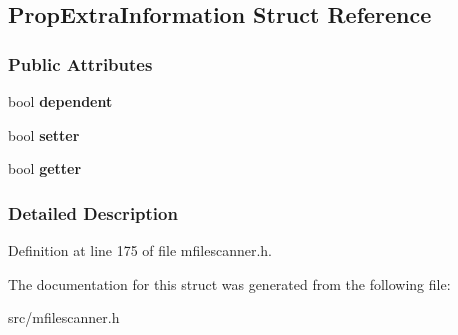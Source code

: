 \hypertarget{struct_prop_extra_information}{}\subsection{Prop\+Extra\+Information Struct Reference}
\label{struct_prop_extra_information}
\subsubsection*{Public Attributes}
\begin{DoxyCompactItemize}
\item 
\hypertarget{struct_prop_extra_information_aec25377d004c28effb13792fea849b87}{}bool {\bfseries dependent}\label{struct_prop_extra_information_aec25377d004c28effb13792fea849b87}

\item 
\hypertarget{struct_prop_extra_information_ae536cd8d7bd3dbd3318b67e8bd720a0b}{}bool {\bfseries setter}\label{struct_prop_extra_information_ae536cd8d7bd3dbd3318b67e8bd720a0b}

\item 
\hypertarget{struct_prop_extra_information_abd227409c779f008ce4df64ef0968246}{}bool {\bfseries getter}\label{struct_prop_extra_information_abd227409c779f008ce4df64ef0968246}

\end{DoxyCompactItemize}


\subsubsection{Detailed Description}


Definition at line 175 of file mfilescanner.\+h.



The documentation for this struct was generated from the following file\+:\begin{DoxyCompactItemize}
\item 
src/mfilescanner.\+h\end{DoxyCompactItemize}
